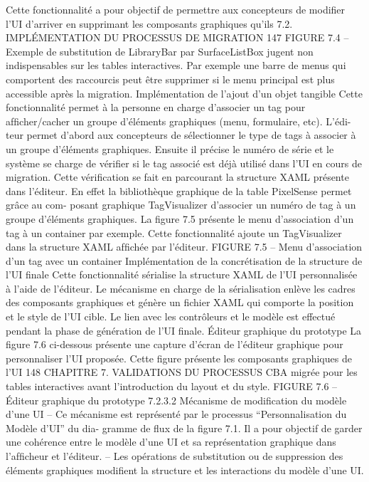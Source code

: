 \documentclass{article}
\begin{document}
Cette fonctionnalité a pour objectif de
permettre aux concepteurs de modiﬁer l’UI d’arriver en supprimant les composants graphiques qu’ils
7.2. IMPLÉMENTATION DU PROCESSUS DE MIGRATION
147
FIGURE 7.4 – Exemple de substitution de LibraryBar par SurfaceListBox
jugent non indispensables sur les tables interactives. Par exemple une barre de menus qui comportent
des raccourcis peut être supprimer si le menu principal est plus accessible après la migration.
Implémentation de l’ajout d’un objet tangible
Cette fonctionnalité permet à la personne en charge
d’associer un tag pour afﬁcher/cacher un groupe d’éléments graphiques (menu, formulaire, etc). L’édi-
teur permet d’abord aux concepteurs de sélectionner le type de tags à associer à un groupe d’éléments
graphiques. Ensuite il précise le numéro de série et le système se charge de vériﬁer si le tag associé est
déjà utilisé dans l’UI en cours de migration. Cette vériﬁcation se fait en parcourant la structure XAML
présente dans l’éditeur. En effet la bibliothèque graphique de la table PixelSense permet grâce au com-
posant graphique TagVisualizer d’associer un numéro de tag à un groupe d’éléments graphiques. La
ﬁgure 7.5 présente le menu d’association d’un tag à un container par exemple. Cette fonctionnalité
ajoute un TagVisualizer dans la structure XAML afﬁchée par l’éditeur.
FIGURE 7.5 – Menu d’association d’un tag avec un container
Implémentation de la concrétisation de la structure de l’UI ﬁnale
Cette fonctionnalité sérialise la
structure XAML de l’UI personnalisée à l’aide de l’éditeur. Le mécanisme en charge de la sérialisation
enlève les cadres des composants graphiques et génère un ﬁchier XAML qui comporte la position et le
style de l’UI cible. Le lien avec les contrôleurs et le modèle est effectué pendant la phase de génération
de l’UI ﬁnale.
Éditeur graphique du prototype
La ﬁgure 7.6 ci-dessous présente une capture d’écran de l’éditeur
graphique pour personnaliser l’UI proposée. Cette ﬁgure présente les composants graphiques de l’UI
148
CHAPITRE 7. VALIDATIONS DU PROCESSUS
CBA migrée pour les tables interactives avant l’introduction du layout et du style.
FIGURE 7.6 – Éditeur graphique du prototype
7.2.3.2
Mécanisme de modiﬁcation du modèle d’une UI
– Ce mécanisme est représenté par le processus “Personnalisation du Modèle d’UI” du dia-
gramme de ﬂux de la ﬁgure 7.1. Il a pour objectif de garder une cohérence entre le modèle
d’une UI et sa représentation graphique dans l’afﬁcheur et l’éditeur.
– Les opérations de substitution ou de suppression des éléments graphiques modiﬁent la structure
et les interactions du modèle d’une UI.
\end{document}
